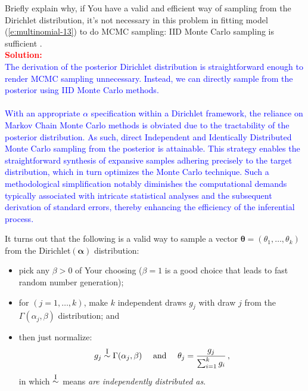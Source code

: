 \documentclass[12pt]{article}
\begin{document}
\begin{itemize}
\begin{itemize}
\begin{itemize}
Briefly explain why, if You have a valid and efficient way of sampling from the Dirichlet distribution, it's not necessary in this problem in fitting model (\ref{e:multinomial-13}) to do MCMC sampling: IID Monte Carlo sampling is sufficient \textit{\fbox{\textbf{[10 points]}}}. \vspace*{0.025in} \\
\textcolor{red}{\textbf{Solution:}} \\
\textcolor{blue}{The derivation of the posterior Dirichlet distribution is straightforward enough to render MCMC sampling unnecessary. Instead, we can directly sample from the posterior using IID Monte Carlo methods.
\\ \\
With an appropriate \(\alpha\) specification within a Dirichlet framework, the reliance on Markov Chain Monte Carlo methods is obviated due to the tractability of the posterior distribution. As such, direct Independent and Identically Distributed Monte Carlo sampling from the posterior is attainable. This strategy enables the straightforward synthesis of expansive samples adhering precisely to the target distribution, which in turn optimizes the Monte Carlo technique. Such a methodological simplification notably diminishes the computational demands typically associated with intricate statistical analyses and the subsequent derivation of standard errors, thereby enhancing the efficiency of the inferential process.}

\end{itemize}

It turns out that the following is a valid way to sample a vector $\bm{ \theta } = ( \theta_1, \dots, \theta_k )$ from the Dirichlet$( \bm{ \alpha } )$ distribution: 

\begin{itemize}

\item

pick any $\beta > 0$ of Your choosing ($\beta = 1$ is a good choice that leads to fast random number generation);

\item

for $( j = 1, \dots, k )$, make $k$ independent draws $g_j$ with draw $j$ from the $\Gamma ( \alpha_j , \beta )$ distribution; and 

\item

then just normalize:
\begin{equation} \label{e:multinomial-14}
g_j \stackrel{ \textrm{\footnotesize I} }{ \sim } \Gamma ( \alpha_j , \beta ) \ \ \ \textrm{ and } \ \ \ \theta_j = \frac{ g_j }{ \sum_{ i = 1 }^k g_i } \, ,
\end{equation}
in which $\stackrel{ \textrm{\footnotesize I} }{ \sim }$ means \textit{are independently distributed as}.


\end{itemize}
\end{itemize}
\end{itemize}
\end{document}
